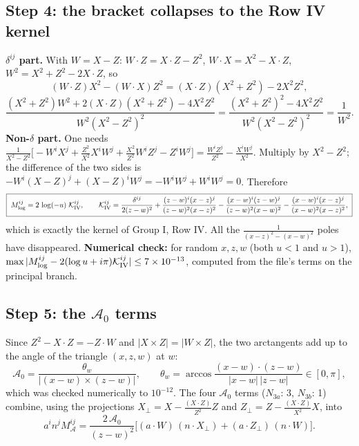 \documentclass[10pt]{article}
\numberwithin{equation}{section}
\begin{document}
\subsection{Step 4: the bracket collapses to the Row IV kernel}
\textbf{$\delta^{ij}$ part.} With $W=X-Z$: $W\cdot Z=X\cdot Z-Z^{2}$, $W\cdot X=X^{2}-X\cdot Z$, $W^{2}=X^{2}+Z^{2}-2X\cdot Z$, so
\[
(W\cdot Z)X^{2}-(W\cdot X)Z^{2}=(X\cdot Z)(X^{2}+Z^{2})-2X^{2}Z^{2},
\]
\[
\frac{(X^{2}+Z^{2})W^{2}+2(X\cdot Z)(X^{2}+Z^{2})-4X^{2}Z^{2}}{W^{2}(X^{2}-Z^{2})^{2}}=\frac{(X^{2}+Z^{2})^{2}-4X^{2}Z^{2}}{W^{2}(X^{2}-Z^{2})^{2}}=\frac{1}{W^{2}} .
\]
\textbf{Non-$\delta$ part.} One needs
$\frac{1}{X^{2}-Z^{2}}\big[-W^{i}X^{j}+\frac{Z^{2}}{X^{2}}X^{i}W^{j}+\frac{X^{2}}{Z^{2}}W^{i}Z^{j}-Z^{i}W^{j}\big]=\frac{W^{i}Z^{j}}{Z^{2}}-\frac{X^{i}W^{j}}{X^{2}}$.
Multiply by $X^{2}-Z^{2}$; the difference of the two sides is $-W^{i}(X-Z)^{j}+(X-Z)^{i}W^{j}=-W^{i}W^{j}+W^{i}W^{j}=0$. Therefore
\begin{equation}
\boxed{\;M^{ij}_{\log}=2\,\log(-u)\;\mathcal K^{ij}_{\rm IV},\qquad
\mathcal K^{ij}_{\rm IV}=\frac{\delta^{ij}}{2(z-w)^{2}}+\frac{(z-w)^{i}(x-z)^{j}}{(z-w)^{2}(x-z)^{2}}-\frac{(x-w)^{i}(z-w)^{j}}{(z-w)^{2}(x-w)^{2}}-\frac{(x-w)^{i}(x-z)^{j}}{(x-w)^{2}(x-z)^{2}},\;}
\end{equation}
which is exactly the kernel of Group I, Row IV. All the $\frac{1}{(x-z)^{2}-(x-w)^{2}}$ poles have disappeared. \textbf{Numerical check:} for random $x,z,w$ (both $u<1$ and $u>1$), $\max|M^{ij}_{\log}-2(\log u+i\pi)\mathcal K^{ij}_{\rm IV}|\le7\times10^{-13}$, computed from the file's terms on the principal branch.

\subsection{Step 5: the $\mathcal A_{0}$ terms}
Since $Z^{2}-X\cdot Z=-Z\cdot W$ and $|X\times Z|=|W\times Z|$, the two arctangents add up to the angle of the triangle $(x,z,w)$ at $w$:
\begin{equation}
\boxed{\;\mathcal A_{0}=\frac{\theta_{w}}{\big|(x-w)\times(z-w)\big|},\qquad \theta_{w}=\arccos\frac{(x-w)\cdot(z-w)}{|x-w|\,|z-w|}\in[0,\pi],\;}
\end{equation}
which was checked numerically to $10^{-12}$. The four $\mathcal A_{0}$ terms ($N_{3a}$: 3, $N_{3b}$: 1) combine, using the projections $X_{\perp}=X-\frac{(X\cdot Z)}{Z^{2}}Z$ and $Z_{\perp}=Z-\frac{(X\cdot Z)}{X^{2}}X$, into
\begin{equation}
a^{i}n^{j}M^{ij}_{\mathcal A}=\frac{2\,\mathcal A_{0}}{(z-w)^{2}}\Big[(a\cdot W)\,(n\cdot X_{\perp})+(a\cdot Z_{\perp})\,(n\cdot W)\Big].
\end{equation}
\end{document}

